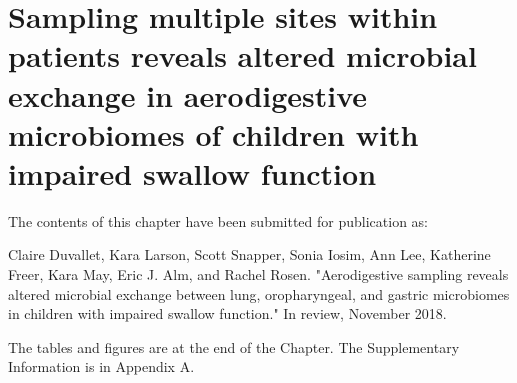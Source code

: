 
\graphicspath{{aspiration/figures/}}

\chapter{Sampling multiple sites within patients reveals altered microbial exchange in aerodigestive microbiomes of children with impaired swallow function}

The contents of this chapter have been submitted for publication as:

Claire Duvallet, Kara Larson, Scott Snapper, Sonia Iosim, Ann Lee, Katherine Freer, Kara May, Eric J. Alm, and Rachel Rosen. "Aerodigestive sampling reveals altered microbial exchange between lung, oropharyngeal, and gastric microbiomes in children with impaired swallow function." In review, November 2018.

The tables and figures are at the end of the Chapter. The Supplementary Information is in Appendix A.

\clearpage

